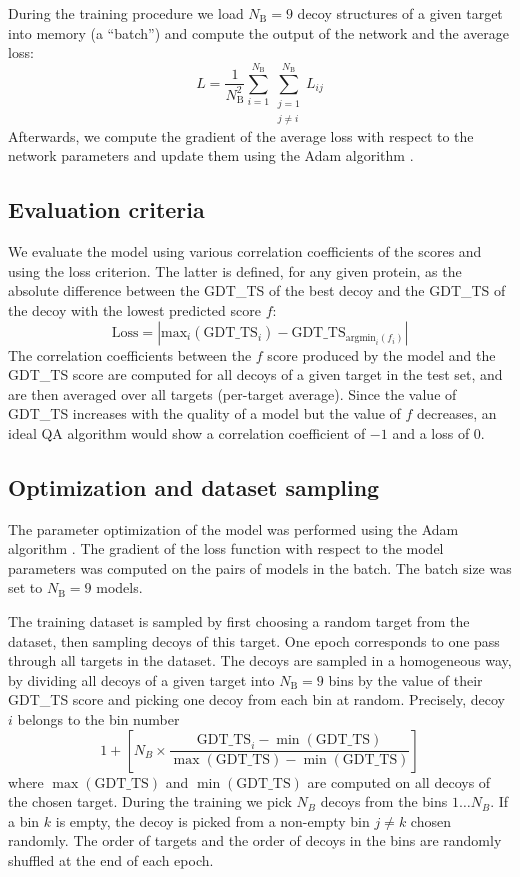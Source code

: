 \documentclass{bioinfo}
\begin{document}
During the training procedure we load $N_\text{B} = 9$ decoy
structures of a given target into memory (a ``batch'') and compute the
output of the network and the average loss:
$$
L = \frac{1}{N_\text{B}^2} \sum_{i=1}^{N_\text{B}}\sum_{\substack{j=1\\j\neq i}}^{N_\text{B}} L_{ij}
$$
Afterwards, we compute the gradient of the average loss with respect
to the network parameters and update them using the Adam algorithm
\citep{kingma2014adam}.


\subsection{Evaluation criteria}
We evaluate the model using various correlation coefficients of the
scores and using the loss criterion. The latter is defined, for any
given protein, as the absolute difference between the GDT\_TS of the
best decoy and the GDT\_TS of the decoy with the lowest predicted
score $f$:
$$ 
\mathrm{Loss} = \left| \mathrm{max}_i(\text{GDT\_TS}_i) - \text{GDT\_TS}_{\mathrm{argmin}_i(f_i)} \right|
$$
The correlation coefficients between the $f$ score produced by the
model and the GDT\_TS score are computed for all decoys of a given
target in the test set, and are then averaged over all targets
(per-target average). Since the value of GDT\_TS increases with the
quality of a model but the value of $f$ decreases, an ideal QA
algorithm would show a correlation coefficient of $-1$ and a loss of
$0$.


\subsection{Optimization and dataset sampling}
The parameter optimization of the model was performed using the Adam
algorithm \citep{kingma2014adam}. The gradient of the loss function
with respect to the model parameters was computed on the pairs of
models in the batch. The batch size was set to $N_\text{B} = 9$
models.

The training dataset is sampled by first choosing a random target from
the dataset, then sampling decoys of this target. One epoch
corresponds to one pass through all targets in the dataset. The decoys
are sampled in a homogeneous way, by dividing all decoys of a given
target into $N_\text{B} = 9$ bins by the value of their GDT\_TS score
and picking one decoy from each bin at random.
Precisely, decoy $i$ belongs to the bin number 
$$
1 + \left[ N_B \times \frac{\text{GDT\_TS}_i - \min(\text{GDT\_TS}) }{\max(\text{GDT\_TS}) - \min(\text{GDT\_TS})} \right]
$$
where $\max(\text{GDT\_TS})$ and $\min(\text{GDT\_TS})$ are computed on all
decoys of the chosen target.
During the training we pick $N_B$ decoys from the bins ${1 \dots N_B}$.
If a bin $k$ is empty, the decoy is picked from a non-empty bin $j \neq k$ chosen randomly.
The order of targets and the order of decoys in the bins are randomly shuffled at the end of each
epoch.
\end{document}
